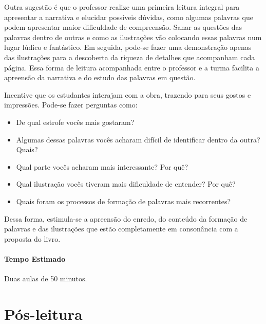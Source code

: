 \documentclass[11pt]{extarticle}
\begin{document}
Outra sugestão é que o professor realize uma primeira leitura integral para apresentar a narrativa e elucidar possíveis dúvidas, como algumas palavras que podem apresentar maior dificuldade de compreensão. Sanar as questões das palavras dentro de outras e como as ilustrações vão colocando essas palavras num lugar lúdico e fantástico. Em seguida, pode-se fazer uma demonstração apenas das ilustrações para a descoberta da riqueza de detalhes que acompanham cada página. Essa forma de leitura acompanhada entre o professor e a turma facilita a apreensão da narrativa e do estudo das palavras em questão.

Incentive que os estudantes interajam com a obra, trazendo para seus gostos e impressões. Pode-se fazer perguntas como:

\begin{itemize}
\item De qual estrofe vocês mais gostaram?
\item Algumas dessas palavras vocês acharam difícil de identificar dentro da outra? Quais?
\item Qual parte vocês acharam mais interessante? Por quê?
\item Qual ilustração vocês tiveram mais dificuldade de entender? Por quê?
\item Quais foram os processos de formação de palavras mais recorrentes?
\end{itemize}

Dessa forma, estimula-se a apreensão do enredo, do conteúdo da formação de palavras e das ilustrações que estão completamente em consonância com a proposta do livro.

\paragraph{Tempo Estimado} Duas aulas de 50 minutos. 

\section{Pós-leitura}

\end{document}
